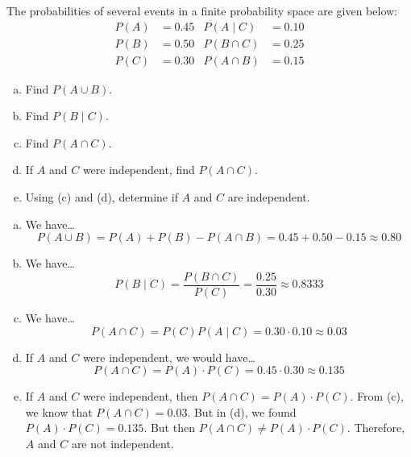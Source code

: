 \documentclass[11pt,letterpaper]{article}
\begin{document}

 The probabilities of several events in a finite probability space are given below:
	\[
	\begin{aligned}
	P(A)&= 0.45 & P(A \;|\; C)&= 0.10 \\
	P(B)&= 0.50 & P(B \cap C)&= 0.25 \\
	P(C)&= 0.30 & P(A \cap B)&= 0.15
	\end{aligned}
	\] 
\begin{enumerate}[(a)]
\item Find $P(A \cup B)$.
\item Find $P(B \;|\; C)$.
\item Find $P(A \cap C)$.
\item If $A$ and $C$ were independent, find $P(A \cap C)$.
\item Using (c) and (d), determine if $A$ and $C$ are independent. 
\end{enumerate} \pspace

\sol 
\begin{enumerate}[(a)]
\item We have\dots
	\[
	P(A \cup B)= P(A) + P(B) - P(A \cap B)= 0.45 + 0.50 - 0.15 \approx 0.80
	\] \pspace

\item We have\dots
	\[
	P(B \;|\; C)= \dfrac{P(B \cap C)}{P(C)}= \dfrac{0.25}{0.30} \approx 0.8333
	\] \pspace

\item We have\dots
	\[
	P(A \cap C)= P(C) P(A \;|\;C)= 0.30 \cdot 0.10 \approx 0.03
	\] \pspace

\item If $A$ and $C$ were independent, we would have\dots
	\[
	P(A \cap C)= P(A) \cdot P(C)= 0.45 \cdot 0.30 \approx 0.135
	\] \pspace

\item If $A$ and $C$ were independent, then $P(A \cap C)= P(A) \cdot P(C)$. From (c), we know that $P(A \cap C)= 0.03$. But in (d), we found $P(A) \cdot P(C)= 0.135$. But then $P(A \cap C) \neq P(A) \cdot P(C)$. Therefore, $A$ and $C$ are not independent. 
\end{enumerate}



\newpage
\end{document}
